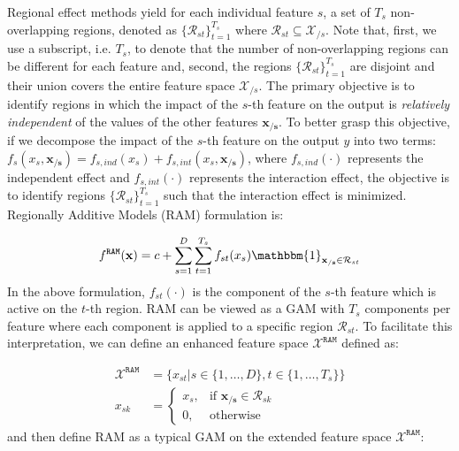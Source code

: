 \documentclass[12pt]{article}
\newcommand{\xb}{\mathbf{x}}
\newcommand{\xcc}{\mathbf{x_{/s}}}
\newcommand{\Xcal}{\mathcal{X}}
\newcommand{\when}[1]{\mathbbm{1}_{#1}}
\begin{document}
Regional effect methods yield for each individual feature \(s\), a set of \(T_s\) non-overlapping regions,
denoted as \(\{\mathcal{R}_{st}\}_{t=1}^{T_s}\) where \(\mathcal{R}_{st} \subseteq \Xcal_{/s}\).
Note that, first, we use a subscript, i.e. $T_s$, to denote that the number of non-overlapping regions can be different for each feature and, second,
the regions \(\{\mathcal{R}_{st}\}_{t=1}^{T_s}\) are disjoint and their union covers the entire feature space \(\Xcal_{/s}\).
The primary objective is to identify regions in which the impact of the \(s\)-th feature on the output is
\textit{relatively independent} of the values of the other features \(\xcc\).
To better grasp this objective, if we decompose the impact of the \(s\)-th feature on the output $y$ into two terms:
\(f_s(x_s, \xcc) = f_{s,ind}(x_s) + f_{s, int}(x_s, \xcc)\),
where \(f_{s,ind}(\cdot)\) represents the independent effect
and \(f_{s, int}(\cdot)\) represents the interaction effect,
the objective is to identify regions \(\{\mathcal{R}_{st}\}_{t=1}^{T_s}\) such that the interaction effect is minimized.
Regionally Additive Models (RAM) formulation is:

\begin{equation}
\label{eq:ram_formulation}
f^{\mathtt{RAM}}(\xb) = c + \sum_{s=1}^D \sum_{t=1}^{T_s} f_{st}(x_s) \when{\xcc \in \mathcal{R}_{st}}
\end{equation}
%
In the above formulation, \(f_{st}(\cdot)\) is the component of the \(s\)-th feature which is active on the \(t\)-th region.
RAM can be viewed as a GAM with \(T_s\) components per feature where each component is applied to a specific region \(\mathcal{R}_{st}\).
To facilitate this interpretation, we can define an enhanced feature space \(\Xcal^\mathtt{RAM}\) defined as:

\begin{equation}
\label{eq:ram_feature_space}
\begin{aligned}
\Xcal^{\mathtt{RAM}} &= \{x_{st} | s \in \{1, \ldots, D\}, t \in \{1, \ldots, T_s\}\} \\
x_{sk} &= \begin{cases}
x_s, & \text{if } \xcc \in \mathcal{R}_{sk} \\
0, & \text{otherwise}
\end{cases}
\end{aligned}
\end{equation}
%
and then define RAM as a typical GAM on the extended feature space \(\Xcal^{\mathtt{RAM}}\):
\end{document}
